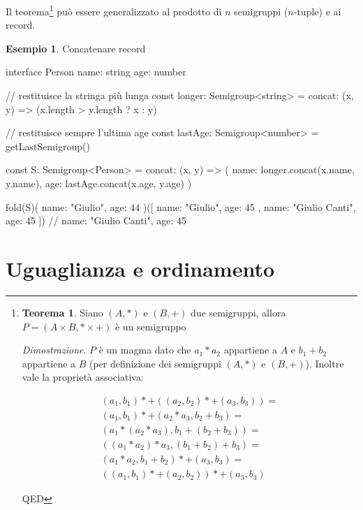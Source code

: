 \documentclass[12pt]{article}
\theoremstyle{definition}
\newtheorem{theorem}{Teorema}[section]
\newtheorem{example}{Esempio}[section]
\newenvironment{code}
  {\vspace{0.5cm} \VerbatimEnvironment\begin{typescriptcode}}
  {\end{typescriptcode} \vspace{0.2cm}}
\begin{document}
Il teorema\footnote{
\begin{theorem}
Siano $(A, *)$ e $(B, +)$ due semigruppi, allora $P = (A \times B, * \times +)$ è un semigruppo
\end{theorem}

\emph{Dimostrazione}. $P$ è un magma dato che $a_1 * a_2$ appartiene a $A$ e $b_1 + b_2$ appartiene a $B$ (per definizione dei semigruppi $(A, *)$ e $(B, +)$).
Inoltre vale la proprietà associativa:

\begin{eqnarray}
(a_1, b_1) *+ ((a_2, b_2) *+ (a_3, b_3)) = \\
(a_1, b_1) *+ (a_2 * a_3, b_2 + b_3) = \\
(a_1 * (a_2 * a_3), b_1 + (b_2 + b_3)) = \\
((a_1 * a_2) * a_3, (b_1 + b_2) + b_3) = \\
(a_1 * a_2, b_1 + b_2) *+ (a_3, b_3) = \\
((a_1, b_1) *+ (a_2, b_2)) *+ (a_3, b_3)
\end{eqnarray}

QED

} può essere generalizzato al prodotto di $n$ semigruppi ($n$-tuple) e ai record.

\begin{example}
Concatenare record

\begin{code}
interface Person {
  name: string
  age: number
}

// restituisce la stringa più lunga
const longer: Semigroup<string> = {
  concat: (x, y) => (x.length > y.length ? x : y)
}

// restituisce sempre l'ultima age
const lastAge: Semigroup<number> = getLastSemigroup()

const S: Semigroup<Person> = {
  concat: (x, y) => ({
    name: longer.concat(x.name, y.name),
    age: lastAge.concat(x.age, y.age)
  })
}

fold(S)({ name: "Giulio", age: 44 })([
  { name: "Giulio", age: 45 },
  { name: "Giulio Canti", age: 45 }
]) // { name: "Giulio Canti", age: 45 }
\end{code}
\end{example}

\newpage

\section{Uguaglianza e ordinamento}
\end{document}
